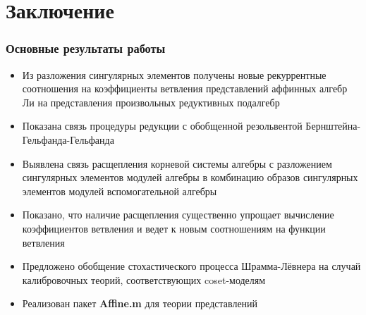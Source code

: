 \documentclass[pdftex]{beamer}
\theoremstyle{definition} \newtheorem{Def}{Определение}
\begin{document}
\section{Заключение}


\begin{frame}
  \frametitle{Основные результаты работы}
\vspace{-0.5cm}
\begin{itemize}
\item Из разложения сингулярных элементов получены новые рекуррентные соотношения на коэффициенты ветвления представлений аффинных алгебр Ли на представления произвольных редуктивных подалгебр
\item Показана связь процедуры редукции с обобщенной резольвентой Бернштейна-Гельфанда-Гельфанда
\item Выявлена связь расщепления корневой системы алгебры с разложением сингулярных элементов модулей алгебры в комбинацию образов сингулярных элементов  модулей вспомогательной алгебры
\item Показано, что наличие расщепления существенно упрощает вычисление коэффициентов ветвления и ведет к новым соотношениям на функции ветвления
\item Предложено обобщение стохастического процесса Шрамма-Лёвнера на случай калибровочных теорий, соответствующих coset-моделям
\item Реализован пакет {\bf Affine.m} для теории представлений
\end{itemize}

\end{frame}
\end{document}
